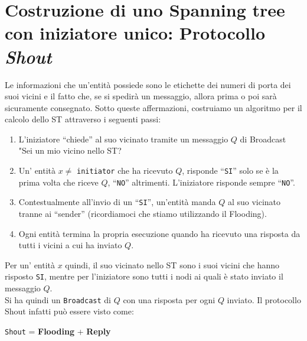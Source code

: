 \section{Costruzione di uno Spanning tree con iniziatore unico: Protocollo
  \textit{Shout}} Le informazioni che un'entità possiede sono le etichette dei
numeri di porta dei suoi vicini e il fatto che, se si spedirà un messaggio,
allora prima o poi sarà sicuramente consegnato. Sotto queste affermazioni,
costruiamo un algoritmo per il calcolo dello ST attraverso i seguenti passi:

\begin{enumerate}
    \item L'iniziatore ``chiede'' al suo vicinato tramite un messaggio $Q$ di
          Broadcast "Sei un mio vicino nello ST?
    \item Un' entità $x \neq $ \texttt{initiator} che ha ricevuto $Q$, risponde
          ``\texttt{SI}'' solo se è la prima volta che riceve $Q$, ``\texttt{NO}''
          altrimenti. L'iniziatore risponde sempre ``\texttt{NO}''.
    \item Contestualmente all'invio di un ``\texttt{SI}'', un'entità manda $Q$ al
          suo vicinato tranne ai ``sender'' (ricordiamoci che stiamo utilizzando il
          Flooding).
    \item Ogni entità termina la propria esecuzione quando ha ricevuto una
          risposta da tutti i vicini a cui ha inviato $Q$.
\end{enumerate}
Per un' entità $x$ quindi, il suo vicinato nello ST sono i suoi vicini che hanno
risposto \texttt{SI}, mentre per l'iniziatore sono tutti i nodi ai quali è stato
inviato il messaggio $Q$.\\
Si ha quindi un \texttt{Broadcast} di $Q$ con una risposta per ogni $Q$ inviato.
Il protocollo Shout infatti può essere visto come:

\begin{center}
    \texttt{Shout} = \textbf{Flooding} + \textbf{Reply}
\end{center}

